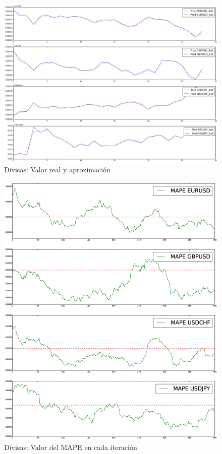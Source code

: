 \begin{figure}[h!t]
    \begin{center}
        \includegraphics[width=\textwidth]{images/y_vs_yhat}
        \caption{Divisas: Valor real y aproximación}
        \label{fig:accuracy}
    \end{center}
\end{figure}


\begin{figure}[h!t]
    \begin{center}
        \includegraphics[width=\textwidth]{images/mapes}
        \caption{Divisas: Valor del MAPE en cada iteración}
        \label{fig:mapes}
    \end{center}
\end{figure}
